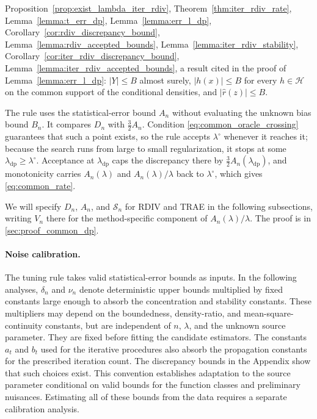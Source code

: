 \documentclass[12pt]{article}
\theoremstyle{plain}
\theoremstyle{definition}
\theoremstyle{remark}
\begin{document}
Proposition~\ref{prop:exist_lambda_iter_rdiv}, Theorem~\ref{thm:iter_rdiv_rate}, Lemma~\ref{lemma:t_err_dp}, Lemma~\ref{lemma:err_l_dp}, Corollary~\ref{cor:rdiv_discrepancy_bound}, Lemma~\ref{lemma:rdiv_accepted_bounds}, Lemma~\ref{lemma:iter_rdiv_stability}, Corollary~\ref{cor:iter_rdiv_discrepancy_bound}, Lemma~\ref{lemma:iter_rdiv_accepted_bounds}, a result cited in the proof of Lemma~\ref{lemma:err_l_dp}: $|Y|\leqslant B$ almost surely, $|h(x)|\leqslant B$ for every $h\in\mathcal H$ on the common support of the conditional densities, and $|\hat r(z)|\leqslant B$.


The rule uses the statistical-error bound $A_n$ without evaluating the unknown bias bound $B_n$. It compares $D_n$ with $\tfrac32A_n$. Condition \eqref{eq:common_oracle_crossing} guarantees that such a point exists, so the rule accepts $\lambda^\circ$ whenever it reaches it; because the search runs from large to small regularization, it stops at some $\lambda_{\mathrm{dp}}\geqslant\lambda^\circ$. Acceptance at $\lambda_{\mathrm{dp}}$ caps the discrepancy there by $\tfrac32A_n(\lambda_{\mathrm{dp}})$, and monotonicity carries $A_n(\lambda)$ and $A_n(\lambda)/\lambda$ back to $\lambda^\circ$, which gives \eqref{eq:common_rate}.

We will specify $D_n$, $A_n$, and $\mathcal S_n$ for RDIV and TRAE in the following subsections, writing $V_n$ there for the method-specific component of $A_n(\lambda)/\lambda$. The proof is in \cref{sec:proof_common_dp}.

\paragraph{Noise calibration.}
The tuning rule takes valid statistical-error bounds as inputs. In the following analyses, $\delta_n$ and $\nu_n$ denote deterministic upper bounds multiplied by fixed constants large enough to absorb the concentration and stability constants. These multipliers may depend on the boundedness, density-ratio, and mean-square-continuity constants, but are independent of $n$, $\lambda$, and the unknown source parameter. They are fixed before fitting the candidate estimators. The constants $a_t$ and $b_t$ used for the iterative procedures also absorb the propagation constants for the prescribed iteration count. The discrepancy bounds in the Appendix show that such choices exist. This convention establishes adaptation to the source parameter conditional on valid bounds for the function classes and preliminary nuisances. Estimating all of these bounds from the data requires a separate calibration analysis.
\end{document}
